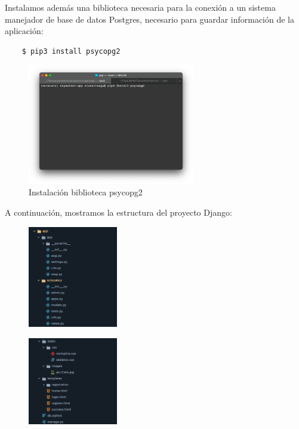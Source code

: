 \documentclass{article}
\begin{document}
\begin{enumerate}
    Instalamos además una biblioteca necesaria para la conexión a un
    sistema manejador de base de datos Postgres, necesario para guardar
    información de la aplicación:
    \begin{lstlisting}
    $ pip3 install psycopg2
    \end{lstlisting}
    \begin{figure}[H]
      \centering
      \includegraphics[width=0.65\textwidth]{AppServer/f6}
      \caption{Instalación biblioteca psycopg2}
    \end{figure}

    A continuación, mostramos la estructura del proyecto Django:
    \begin{figure}[H]
      \centering
      \includegraphics[width=0.35\textwidth]{AppServer/e1}
    \end{figure}
    \begin{figure}[H]
      \centering
      \includegraphics[width=0.35\textwidth]{AppServer/e2}
    \end{figure}


\end{enumerate}
\end{document}
